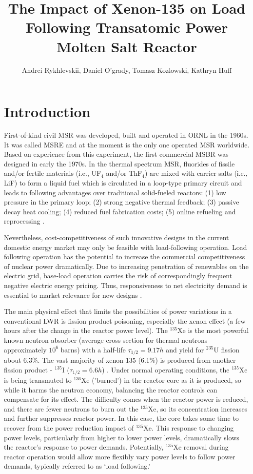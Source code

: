 \documentclass{anstrans}
\title{The Impact of Xenon-135 on Load Following Transatomic Power 
Molten Salt Reactor}
\author{Andrei Rykhlevskii, Daniel O'grady, Tomasz Kozlowski, Kathryn Huff}
\institute{
        Department of Nuclear, Plasma, and Radiological Engineering, University 
        of Illinois at Urbana-Champaign \break
        Urbana, IL
}
\begin{document}
\section{Introduction}
First-of-kind civil \gls{MSR} was developed, built and operated in \gls{ORNL}  
in the 	1960s. It was called \gls{MSRE} and at the moment is the
only one operated 
\gls{MSR} worldwide. Based on experience from this experiment, the first 
commercial \gls{MSBR} was designed in early the 1970s. In the thermal spectrum 
\gls{MSR}, fluorides of fissile and/or fertile materials (i.e., UF$_4$ and/or 
ThF$_4$) are mixed with carrier salts (i.e., LiF) to form a liquid fuel
which 
is circulated in a loop-type primary circuit and leads to following 
advantages over traditional solid-fueled reactors: (1) low pressure 
in the primary loop; (2) strong negative thermal feedback; (3) passive decay 
heat cooling; (4) reduced fuel fabrication costs; (5) online refueling and 
reprocessing \cite{haubenreich_experience_1970}.

Nevertheless, cost-competitiveness of such innovative designs in the current 
domestic energy market may only be feasible with load-following operation. 
Load following operation has the potential to increase the commercial 
competitiveness of nuclear power dramatically. Due to increasing penetration of 
renewables on the electric grid, base-load operation carries the risk of 
correspondingly frequent negative electric energy pricing. Thus, 
responsiveness to net electricity demand is essential to market relevance for
new designs \cite{energy_information_administration_u.s._2016}.

The main physical effect that limits the possibilities of power variations in a 
conventional \gls{LWR} is fission product poisoning, especially the xenon 
effect (a few hours after the change in the reactor power level).  The 
$^{135}$Xe is the most powerful known neutron absorber (average cross section 
for thermal neutrons approximately $10^6$ barns) with a half-life  
$\tau_{1/2}=9.17h$ and yield for $^{235}$U fission about 6.3\%. The vast 
majority of xenon-135 (6.1\%) is produced from another fission product - 
$^{135}$I ($\tau_{1/2}=6.6h$) \cite{lokhov_technical_2011}. Under normal 
operating conditions, the $^{135}$Xe is being transmuted to $^{136}$Xe 
('burned') in the reactor core as it is produced, so while it harms the 
neutron economy, balancing the reactor controls can compensate 
for its effect. The difficulty comes when the reactor power is reduced, and 
there are fewer neutrons to burn out the $^{135}$Xe, so its concentration 
increases and further suppresses reactor power. In this case, the core takes 
some time to recover from the power reduction impact of $^{135}$Xe. This 
response to changing power levels, particularly from higher to lower power 
levels, dramatically slows the reactor's response to power demands. 
Potentially, $^{135}$Xe removal during reactor operation would allow more 
flexibly vary power levels to follow power demands, typically referred to 
as `load following.'
\end{document}
